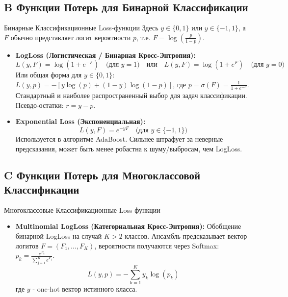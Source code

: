 \subsection{B Функции Потерь для Бинарной Классификации}
\begin{myexampleblock}{Бинарные Классификационные Loss-функции}
    Здесь $y \in \{0, 1\}$ или $y \in \{-1, 1\}$, а $F$ обычно представляет логит вероятности $p$, т.е. $F = \log(\frac{p}{1-p})$.
    \begin{itemize}[nosep, leftmargin=*]
        \item \textbf{LogLoss (Логистическая / Бинарная Кросс-Энтропия):}
            \[ L(y, F) = \log(1 + e^{-F}) \quad \text{(для } y=1 \text{)} \quad \text{или} \quad L(y, F) = \log(1 + e^{F}) \quad \text{(для } y=0 \text{)} \]
            Или общая форма для $y \in \{0, 1\}$: $L(y, p) = -[y \log(p) + (1-y)\log(1-p)]$, где $p = \sigma(F) = \frac{1}{1+e^{-F}}$.
            Стандартный и наиболее распространенный выбор для задач классификации.
            Псевдо-остатки: $r = y - p$.
        \item \textbf{Exponential Loss (Экспоненциальная):}
            \[ L(y, F) = e^{-yF} \quad \text{(для } y \in \{-1, 1\}\text{)} \]
            Используется в алгоритме AdaBoost. Сильнее штрафует за неверные предсказания, может быть менее робастна к шуму/выбросам, чем LogLoss.
    \end{itemize}
\end{myexampleblock}

\subsection{C Функции Потерь для Многоклассовой Классификации}
\begin{myexampleblock}{Многоклассовые Классификационные Loss-функции}
    \begin{itemize}[nosep, leftmargin=*]
        \item \textbf{Multinomial LogLoss (Категориальная Кросс-Энтропия):} Обобщение бинарной LogLoss на случай $K > 2$ классов. Ансамбль предсказывает вектор логитов $F = (F_1, \dots, F_K)$, вероятности получаются через Softmax: $p_k = \frac{e^{F_k}}{\sum_{j=1}^K e^{F_j}}$.
            \[ L(y, p) = - \sum_{k=1}^K y_k \log(p_k) \]
            где $y$ - one-hot вектор истинного класса.
    \end{itemize}
\end{myexampleblock}


